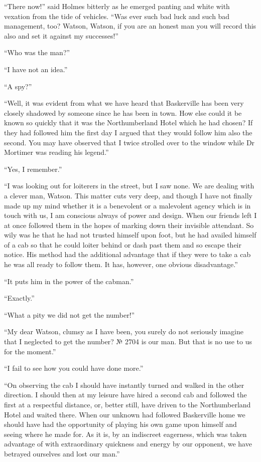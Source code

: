 \documentclass[paper=5.5in:8.5in,BCOR=7mm,twoside,DIV=calc,12pt,usegeometry,openany,chapterprefix,endperiod]{scrbook} %
\begin{document}
\enquote{There now!} said Holmes bitterly as he emerged panting and white with vexation from the tide of vehicles. \enquote{Was ever such bad luck and such bad management, too? Watson, Watson, if you are an honest man you will record this also and set it against my successes!}

\enquote{Who was the man?}

\enquote{I have not an idea.}

\enquote{A spy?}

\enquote{Well, it was evident from what we have heard that Baskerville has been very closely shadowed by someone since he has been in town. How else could it be known so quickly that it was the Northumberland Hotel which he had chosen? If they had followed him the first day I argued that they would follow him also the second. You may have observed that I twice strolled over to the window while Dr Mortimer was reading his legend.}

\enquote{Yes, I remember.}

\enquote{I was looking out for loiterers in the street, but I saw none. We are dealing with a clever man, Watson. This matter cuts very deep, and though I have not finally made up my mind whether it is a benevolent or a malevolent agency which is in touch with us, I am conscious always of power and design. When our friends left I at once followed them in the hopes of marking down their invisible attendant. So wily was he that he had not trusted himself upon foot, but he had availed himself of a cab so that he could loiter behind or dash past them and so escape their notice. His method had the additional advantage that if they were to take a cab he was all ready to follow them. It has, however, one obvious disadvantage.}

\enquote{It puts him in the power of the cabman.}

\enquote{Exactly.}

\enquote{What a pity we did not get the number!}

\enquote{My dear Watson, clumsy as I have been, you surely do not seriously imagine that I neglected to get the number? № 2704 is our man. But that is no use to us for the moment.}

\enquote{I fail to see how you could have done more.}

\enquote{On observing the cab I should have instantly turned and walked in the other direction. I should then at my leisure have hired a second cab and followed the first at a respectful distance, or, better still, have driven to the Northumberland Hotel and waited there. When our unknown had followed Baskerville home we should have had the opportunity of playing his own game upon himself and seeing where he made for. As it is, by an indiscreet eagerness, which was taken advantage of with extraordinary quickness and energy by our opponent, we have betrayed ourselves and lost our man.}
\end{document}
